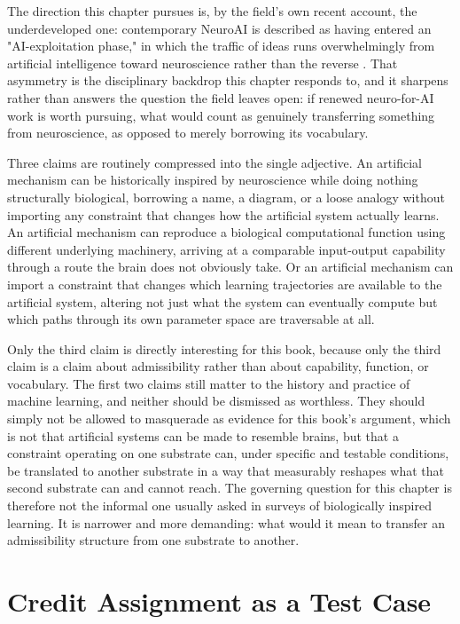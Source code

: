 \documentclass[11pt]{book}
\begin{document}
The direction this chapter pursues is, by the field's own recent account, the underdeveloped one: contemporary NeuroAI is described as having entered an "AI-exploitation phase," in which the traffic of ideas runs overwhelmingly from artificial intelligence toward neuroscience rather than the reverse \cite{sadehclopath2025}. That asymmetry is the disciplinary backdrop this chapter responds to, and it sharpens rather than answers the question the field leaves open: if renewed neuro-for-AI work is worth pursuing, what would count as genuinely transferring something from neuroscience, as opposed to merely borrowing its vocabulary.

Three claims are routinely compressed into the single adjective. An artificial mechanism can be historically inspired by neuroscience while doing nothing structurally biological, borrowing a name, a diagram, or a loose analogy without importing any constraint that changes how the artificial system actually learns. An artificial mechanism can reproduce a biological computational function using different underlying machinery, arriving at a comparable input-output capability through a route the brain does not obviously take. Or an artificial mechanism can import a constraint that changes which learning trajectories are available to the artificial system, altering not just what the system can eventually compute but which paths through its own parameter space are traversable at all.

Only the third claim is directly interesting for this book, because only the third claim is a claim about admissibility rather than about capability, function, or vocabulary. The first two claims still matter to the history and practice of machine learning, and neither should be dismissed as worthless. They should simply not be allowed to masquerade as evidence for this book's argument, which is not that artificial systems can be made to resemble brains, but that a constraint operating on one substrate can, under specific and testable conditions, be translated to another substrate in a way that measurably reshapes what that second substrate can and cannot reach. The governing question for this chapter is therefore not the informal one usually asked in surveys of biologically inspired learning. It is narrower and more demanding: what would it mean to transfer an admissibility structure from one substrate to another.

\section{Credit Assignment as a Test Case}
\end{document}
